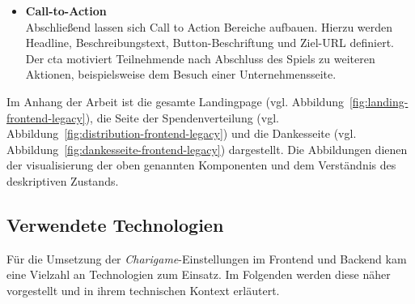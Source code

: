 \begin{itemize}
\item \textbf{Call-to-Action} \\
Abschließend lassen sich Call to Action Bereiche aufbauen. Hierzu werden Headline, Beschreibungstext, Button-Beschriftung und Ziel-URL definiert.
Der \gls{cta} motiviert Teilnehmende nach Abschluss des Spiels zu weiteren Aktionen, beispielsweise dem Besuch einer Unternehmensseite.
\end{itemize}

Im Anhang der Arbeit ist die gesamte Landingpage (vgl. Abbildung~\ref{fig:landing-frontend-legacy}), die Seite der Spendenverteilung (vgl. Abbildung~\ref{fig:distribution-frontend-legacy}) und die Dankesseite (vgl. Abbildung~\ref{fig:dankesseite-frontend-legacy}) dargestellt.
Die Abbildungen dienen der visualisierung der oben genannten Komponenten und dem Verständnis des deskriptiven Zustands.
\subsection{Verwendete Technologien}
Für die Umsetzung der \textit{Charigame}-Einstellungen im Frontend und Backend kam eine Vielzahl an Technologien zum Einsatz.
Im Folgenden werden diese näher vorgestellt und in ihrem technischen Kontext erläutert.

